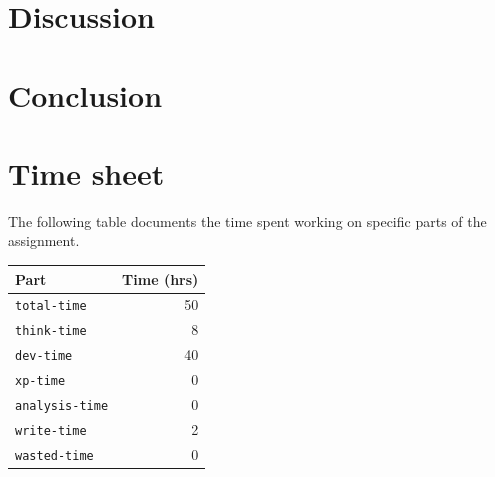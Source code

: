 \documentclass{acm_proc_article-sp}
\begin{document}
\section{Discussion}
\label{sec:discussion}

\section{Conclusion}
\label{sec:conclusion}

{}


\appendix
\section{Time sheet}

The following table documents the time spent working on specific parts of the assignment.

\begin{tabular}{ | l | r | }
	\hline
	Part & Time (hrs) \\ \hline \hline
	\texttt{total-time} & 50\\ \hline
	\texttt{think-time} & 8\\ \hline
	\texttt{dev-time} & 40\\ \hline
	\texttt{xp-time} & 0\\ \hline
	\texttt{analysis-time} & 0\\ \hline
	\texttt{write-time} & 2\\ \hline
	\texttt{wasted-time} & 0\\ \hline
\end{tabular}
\end{document}
